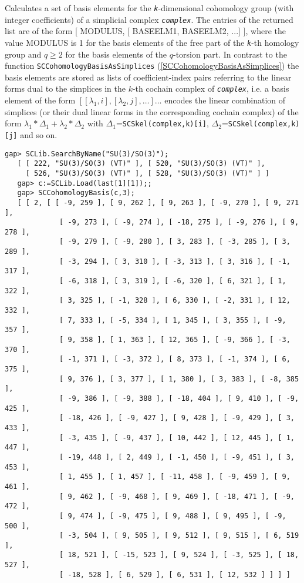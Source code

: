 \documentclass[a4paper,11pt]{report}
\begin{document}
{{{ Calculates a set of basis elements for the \mbox{\texttt{\mdseries\slshape k}}-dimensional cohomology group (with integer coefficients) of a simplicial
complex \mbox{\texttt{\mdseries\slshape complex}}. The entries of the returned list are of the form [ MODULUS, [ BASEELM1,
BASEELM2, ...] ], where the value MODULUS is 1 for the basis elements of the
free part of the \mbox{\texttt{\mdseries\slshape k}}-th homology group and $q\geq 2$ for the basis elements of the $q$-torsion part. In contrast to the function \texttt{SCCohomologyBasisAsSimplices} (\ref{SCCohomologyBasisAsSimplices}) the basis elements are stored as lists of coefficient-index pairs referring to
the linear forms dual to the simplices in the $k$-th cochain complex of \mbox{\texttt{\mdseries\slshape complex}}, i.e. a basis element of the form $[ [ \lambda_1, i], [\lambda_2, j], \dots ] \dots$ encodes the linear combination of simplices (or their dual linear forms in the
corresponding cochain complex) of the form $\lambda_1*\Delta_1+\lambda_2*\Delta_2$ with $\Delta_1$=\texttt{SCSkel(complex,k)[i]}, $\Delta_2$=\texttt{SCSkel(complex,k)[j]} and so on. 
\begin{Verbatim}[commandchars=!@|,fontsize=\small,frame=single,label=Example]
   gap> SCLib.SearchByName("SU(3)/SO(3)");   
   [ [ 222, "SU(3)/SO(3) (VT)" ], [ 520, "SU(3)/SO(3) (VT)" ], 
     [ 526, "SU(3)/SO(3) (VT)" ], [ 528, "SU(3)/SO(3) (VT)" ] ]
   gap> c:=SCLib.Load(last[1][1]);;
   gap> SCCohomologyBasis(c,3); 
   [ [ 2, [ [ -9, 259 ], [ 9, 262 ], [ 9, 263 ], [ -9, 270 ], [ 9, 271 ], 
             [ -9, 273 ], [ -9, 274 ], [ -18, 275 ], [ -9, 276 ], [ 9, 278 ], 
             [ -9, 279 ], [ -9, 280 ], [ 3, 283 ], [ -3, 285 ], [ 3, 289 ], 
             [ -3, 294 ], [ 3, 310 ], [ -3, 313 ], [ 3, 316 ], [ -1, 317 ], 
             [ -6, 318 ], [ 3, 319 ], [ -6, 320 ], [ 6, 321 ], [ 1, 322 ], 
             [ 3, 325 ], [ -1, 328 ], [ 6, 330 ], [ -2, 331 ], [ 12, 332 ], 
             [ 7, 333 ], [ -5, 334 ], [ 1, 345 ], [ 3, 355 ], [ -9, 357 ], 
             [ 9, 358 ], [ 1, 363 ], [ 12, 365 ], [ -9, 366 ], [ -3, 370 ], 
             [ -1, 371 ], [ -3, 372 ], [ 8, 373 ], [ -1, 374 ], [ 6, 375 ], 
             [ 9, 376 ], [ 3, 377 ], [ 1, 380 ], [ 3, 383 ], [ -8, 385 ], 
             [ -9, 386 ], [ -9, 388 ], [ -18, 404 ], [ 9, 410 ], [ -9, 425 ], 
             [ -18, 426 ], [ -9, 427 ], [ 9, 428 ], [ -9, 429 ], [ 3, 433 ], 
             [ -3, 435 ], [ -9, 437 ], [ 10, 442 ], [ 12, 445 ], [ 1, 447 ], 
             [ -19, 448 ], [ 2, 449 ], [ -1, 450 ], [ -9, 451 ], [ 3, 453 ], 
             [ 1, 455 ], [ 1, 457 ], [ -11, 458 ], [ -9, 459 ], [ 9, 461 ], 
             [ 9, 462 ], [ -9, 468 ], [ 9, 469 ], [ -18, 471 ], [ -9, 472 ], 
             [ 9, 474 ], [ -9, 475 ], [ 9, 488 ], [ 9, 495 ], [ -9, 500 ], 
             [ -3, 504 ], [ 9, 505 ], [ 9, 512 ], [ 9, 515 ], [ 6, 519 ], 
             [ 18, 521 ], [ -15, 523 ], [ 9, 524 ], [ -3, 525 ], [ 18, 527 ], 
             [ -18, 528 ], [ 6, 529 ], [ 6, 531 ], [ 12, 532 ] ] ] ]
   

\end{Verbatim}}}}
\end{document}
